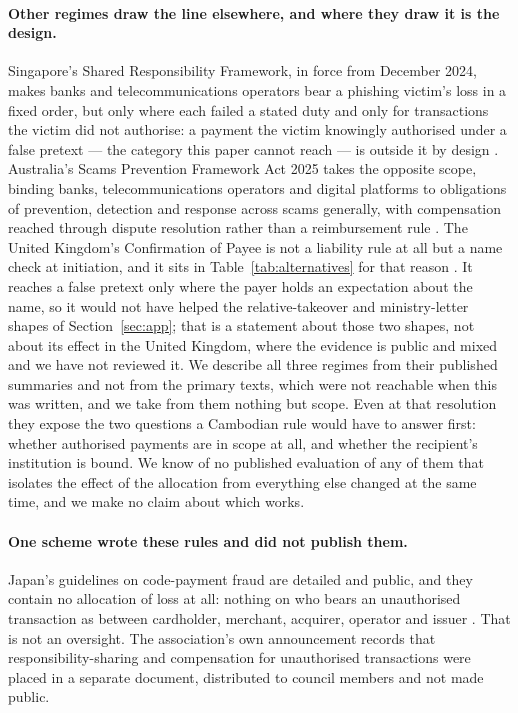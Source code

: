 \documentclass[10pt,a4paper,twocolumn]{article}
\begin{document}
\paragraph{Other regimes draw the line elsewhere, and where they draw it is the
design.} Singapore's Shared Responsibility Framework, in force from December
2024, makes banks and telecommunications operators bear a phishing victim's loss
in a fixed order, but only where each failed a stated duty and only for
transactions the victim did not authorise: a payment the victim knowingly
authorised under a false pretext --- the category this paper cannot reach --- is
outside it by design \citep{mas2024srf}. Australia's Scams Prevention Framework
Act 2025 takes the opposite scope, binding banks, telecommunications operators
and digital platforms to obligations of prevention, detection and response
across scams generally, with compensation reached through dispute resolution
rather than a reimbursement rule \citep{au2025spf}. The United Kingdom's
Confirmation of Payee is not a liability rule at all but a name check at
initiation, and it sits in Table~\ref{tab:alternatives} for that reason
\citep{payuk2020cop}. It reaches a false pretext only where the payer holds an
expectation about the name, so it would not have helped the relative-takeover
and ministry-letter shapes of Section~\ref{sec:app}; that is a statement about
those two shapes, not about its effect in the United Kingdom, where the
evidence is public and mixed and we have not reviewed it. We describe all three
regimes from their published summaries and not from the primary texts, which
were not reachable when this was written, and we take from them nothing but
scope. Even at that resolution they expose the two questions a Cambodian rule
would have to answer first: whether authorised payments are in scope at all,
and whether the recipient's institution is bound. We know of no published
evaluation of any of them that isolates the effect of the allocation from
everything else changed at the same time, and we make no claim about which
works.

\paragraph{One scheme wrote these rules and did not publish them.} Japan's
guidelines on code-payment fraud are detailed and public, and they contain no
allocation of loss at all: nothing on who bears an unauthorised transaction as
between cardholder, merchant, acquirer, operator and issuer
\citep{jpqrfraud,jpqrcard}. That is not an oversight. The association's own
announcement records that responsibility-sharing and compensation for
unauthorised transactions were placed in a separate document, distributed to
council members and not made public.
\end{document}
